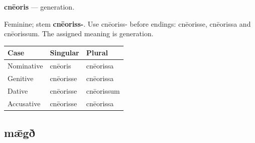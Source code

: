 \par\begin{minipage}{\linewidth}\raggedright
\textbf{cnēoris} — generation.

Feminine; stem \textbf{cnēoriss-}. Use cnēoriss- before endings: cnēorisse, cnēorissa and cnēorissum. The assigned meaning is generation.

\par\begingroup
\fontsize{10.5}{13.2}\selectfont
\setlength{\LTleft}{0pt}\setlength{\LTright}{\fill}
\noindent
\begin{tabular}{@{}>{\raggedright\arraybackslash}p{39.46mm}>{\raggedright\arraybackslash}p{39.46mm}>{\raggedright\arraybackslash}p{39.46mm}@{}}
\toprule
\textbf{Case} & \textbf{Singular} & \textbf{Plural} \\
\midrule
Nominative & cnēoris & cnēorissa \\
Genitive & cnēorisse & cnēorissa \\
Dative & cnēorisse & cnēorissum \\
Accusative & cnēorisse & cnēorissa \\
\bottomrule
\end{tabular}
\par\endgroup

\end{minipage}\par
{}
\subsection*{mǣgð}

